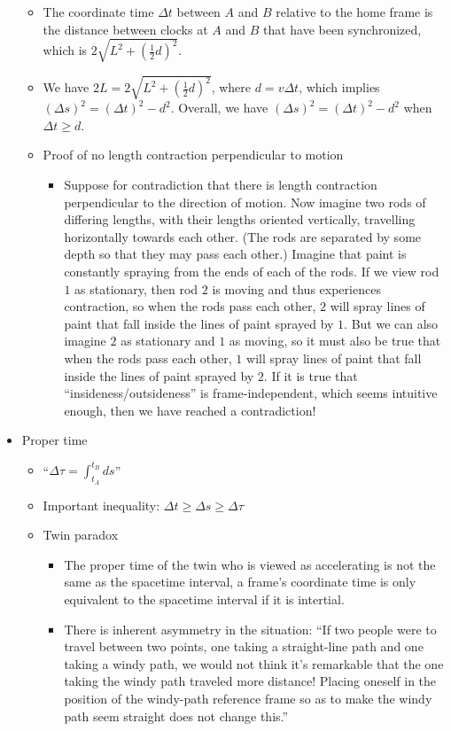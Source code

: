 \begin{itemize}
\begin{itemize}
		\item The coordinate time $\Delta t$ between $A$ and $B$ relative to the home frame is the distance between clocks at $A$ and $B$ that have been synchronized, which is $2\sqrt{L^2 + (\frac{1}{2}d)^2}$.
		\item We have $2L = 2\sqrt{L^2 + (\frac{1}{2}d)^2}$, where $d = v \Delta t$, which implies $(\Delta s)^2 = (\Delta t)^2 - d^2$. Overall, we have $(\Delta s)^2 = (\Delta t)^2 - d^2$ when $\Delta t \geq d$.
		\item Proof of no length contraction perpendicular to motion
		\begin{itemize}
			\item Suppose for contradiction that there is length contraction perpendicular to the direction of motion. Now imagine two rods of differing lengths, with their lengths oriented vertically, travelling horizontally towards each other. (The rods are separated by some depth so that they may pass each other.) Imagine that paint is constantly spraying from the ends of each of the rods. If we view rod $1$ as stationary, then rod $2$ is moving and thus experiences contraction, so when the rods pass each other, $2$ will spray lines of paint that fall inside the lines of paint sprayed by $1$. But we can also imagine $2$ as stationary and $1$ as moving, so it must also be true that when the rods pass each other, $1$ will spray lines of paint that fall inside the lines of paint sprayed by $2$. If it is true that ``insideness/outsideness'' is frame-independent, which seems intuitive enough, then we have reached a contradiction!
		\end{itemize}
	\end{itemize}
	\item Proper time
	\begin{itemize}
		\item ``$\Delta \tau = \int_{t_A}^{t_B} ds$''
		\item Important inequality: $\Delta t \geq \Delta s \geq \Delta \tau$
		\item Twin paradox
		\begin{itemize}
			\item The proper time of the twin who is viewed as accelerating is not the same as the spacetime interval, a frame's coordinate time is only equivalent to the spacetime interval if it is intertial.
			\item There is inherent asymmetry in the situation: ``If two people were to travel between two points, one taking a straight-line path and one taking a windy path, we would not think it's remarkable that the one taking the windy path traveled more distance! Placing oneself in the position of the windy-path reference frame so as to make the windy path seem straight does not change this.''

\end{itemize}
\end{itemize}
\end{itemize}
